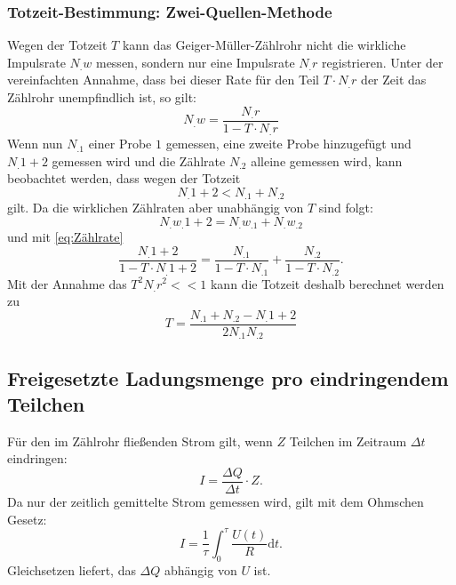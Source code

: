\subsubsection{Totzeit-Bestimmung: Zwei-Quellen-Methode}
Wegen der Totzeit $T$ kann das Geiger-Müller-Zählrohr nicht die wirkliche Impulsrate $N_.w$ messen, sondern nur eine Impulsrate $N_.r$ registrieren. Unter der vereinfachten Annahme, dass bei dieser Rate für den Teil $T\cdot N_.r$ der Zeit das Zählrohr unempfindlich ist, so gilt:
\begin{equation}
N_.w=\frac{N_.r}{1-T\cdot N_.r}\label{eq:Zählrate}
\end{equation}
Wenn nun $N_.1$ einer Probe $1$ gemessen, eine zweite Probe hinzugefügt und $N_.{1+2}$ gemessen wird und die Zählrate $N_.2$ alleine gemessen wird, kann beobachtet werden, dass wegen der Totzeit 
\[
N_.{1+2} < N_.1 + N_.2
\]
gilt.
Da die wirklichen Zählraten aber unabhängig von $T$ sind folgt:
\[
N_.{w_.{1+2}} = N_.{w_.1} + N_.{w_.2}
\]
und mit \eqref{eq:Zählrate}
\[
\frac{N_.{1+2}}{1-T\cdot N_.{1+2}}=\frac{N_.1}{1-T\cdot N_.1}+\frac{N_.2}{1-T\cdot N_.2} \text{.}
\]
Mit der Annahme das $T^2N_.r^2<<1$ kann die Totzeit deshalb berechnet werden zu 
\begin{equation}
T=\frac{N_.1+N_.2-N_.{1+2}}{2N_.1N_.2}\label{eq:T}
\end{equation}
\subsection{Freigesetzte Ladungsmenge pro eindringendem Teilchen}
Für den im Zählrohr fließenden Strom gilt, wenn $Z$ Teilchen im Zeitraum $\Delta t$ eindringen:
\begin{equation}
I=\frac{\Delta Q}{\Delta t}\cdot Z \label{eq:I}\text{.}
\end{equation}
Da nur der zeitlich gemittelte Strom gemessen wird, gilt mit dem Ohmschen Gesetz:
\[
I=\frac{1}{\tau}\int_0^{\tau}\frac{U(t)}{R}\mathrm{d}t \text{.}
\]
Gleichsetzen liefert, das $\Delta Q$ abhängig von $U$ ist.